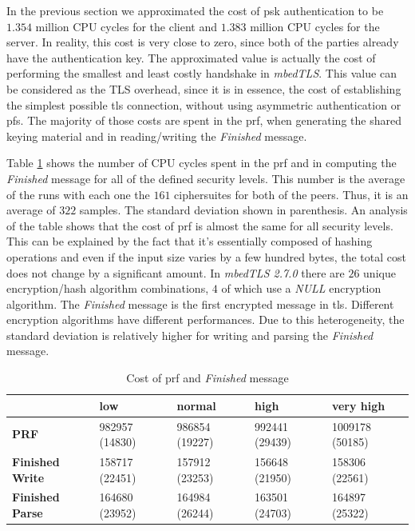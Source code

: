 \documentclass{llncs}
\begin{document}
In the previous section we approximated the cost of \gls{psk} authentication to be $1.354$ million CPU cycles
for the client and $1.383$ million CPU cycles for the server. In reality, this cost is very close to zero, since
both of the parties already have the authentication key. The approximated value is actually the cost of performing the
smallest and least costly handshake in \textit{mbedTLS}.
This value can be considered as the TLS overhead, since it is in essence, the cost of establishing the simplest possible \gls{tls} connection,
without using asymmetric authentication or \gls{pfs}. The majority of those costs are spent in the \gls{prf}, when generating the
shared keying material and in reading/writing the \textit{Finished} message. 

Table \ref{table:hs-key-gen-cost} shows the number of CPU cycles spent in the \gls{prf}
and in computing the \textit{Finished} message for all of the defined security levels.
This number is the average of the runs with each one the $161$ ciphersuites for both of the peers. Thus, it is
an average of $322$ samples. The standard deviation shown in parenthesis.
An analysis of the table shows that the cost of \gls{prf} is almost the same for all security levels. This can be explained by
the fact that it's essentially composed of hashing operations and even if the input size varies
by a few hundred bytes, the total cost does not change by a significant amount.
In \textit{mbedTLS 2.7.0} there are $26$ unique encryption/hash algorithm combinations, $4$ of which use a \textit{NULL} encryption algorithm.
The \textit{Finished} message is the first encrypted message in \gls{tls}. Different encryption algorithms have different
performances. Due to this heterogeneity, the standard deviation is relatively higher for writing and parsing the 
\textit{Finished} message.

\begin{table}[]
\begin{tabular}{|l|l|l|l|l|}
\hline
                        & \textbf{low}   & \textbf{normal} & \textbf{high}  & \textbf{very high} \\ \hline
\textbf{PRF}            & 982957 (14830) & 986854 (19227)  & 992441 (29439) & 1009178 (50185)    \\ \hline
\textbf{Finished Write} & 158717 (22451) & 157912 (23253)  & 156648 (21950) & 158306 (22561)     \\ \hline
\textbf{Finished Parse} & 164680 (23952) & 164984 (26244)  & 163501 (24703) & 164897 (25322)     \\ \hline
\end{tabular}
\centering \caption{\label{table:hs-key-gen-cost} Cost of \gls{prf} and \textit{Finished} message}
\end{table}
\end{document}
